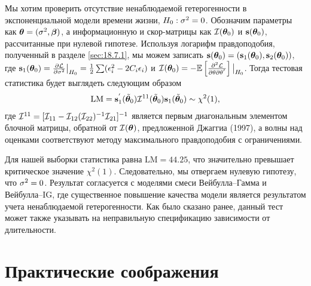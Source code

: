 Мы хотим проверить отсутствие ненаблюдаемой гетерогенности в экспоненциальной модели времени жизни, $H_0:\sigma^2=0$. Обозначим параметры как $\bm{\theta} = (\sigma^2, \bm{\beta})$, а информационную и скор-матрицы как $\mathcal{I}(\bm{\theta}_0)$ и $\mathbf{s}(\bm{\theta}_0)$, рассчитанные при нулевой гипотезе. Используя логарифм правдоподобия, полученный в разделе \ref{sec:18.7.1}, мы можем записать $\mathbf{s}(\bm{\theta}_0) = (\mathbf{s}_1(\bm{\theta}_0),\mathbf{s}_2(\bm{\theta}_0))$, где $\mathbf{s}_1(\bm{\theta}_0) = \frac{\partial\mathcal{L}}{\partial\sigma^2}\big|_{H_0} = \frac{1}{2}\sum(\epsilon^{2}_{i} - 2C_i\epsilon_i)$ и $\mathcal{I}(\bm{\theta}_0) = -\mathbb{E}\left[\frac{\partial^2\mathcal{L}}{\partial\theta\partial\theta^{'}}\right]\big|_{H_0}$. Тогда тестовая статистика будет выглядеть следующим образом
    \begin{align}
        \label{eq:18.36}
            \mathrm{LM} = \mathbf{s}^{'}_{1}(\tilde{\bm{\theta}}_0)\mathcal{I}^{11}(\tilde{\bm{\theta}}_0)\mathbf{s}_1(\tilde{\bm{\theta}}_0)\sim\chi^2(1),
    \end{align}
где $\mathcal{I}^{11} = [\mathcal{I}_{11} - \mathcal{I}_{12}(\mathcal{I}_{22})^{-1}\mathcal{I}_{21}]^{-1}$ является первым диагональным элементом блочной матрицы, обратной от $\mathcal{I}(\bm{\theta})$, предложенной Джаггиа (1997), а волны над оценками соответствуют методу максимального правдоподобия с ограничениями.

Для нашей выборки статистика равна $\mathrm{LM} = 44.25$, что значительно превышает критическое значение $\chi^{2}(1)$. Следовательно, мы отвергаем нулевую гипотезу, что $\sigma^2 = 0$. Результат согласуется с моделями смеси Вейбулла--Гамма и Вейбулла--IG, где существенное повышение качества модели является результатом учета ненаблюдаемой гетерогенности. Как было сказано ранее, данный тест может также указывать на неправильную спецификацию зависимости от длительности.




\section{Практические соображения}\label{sec:18.9}

